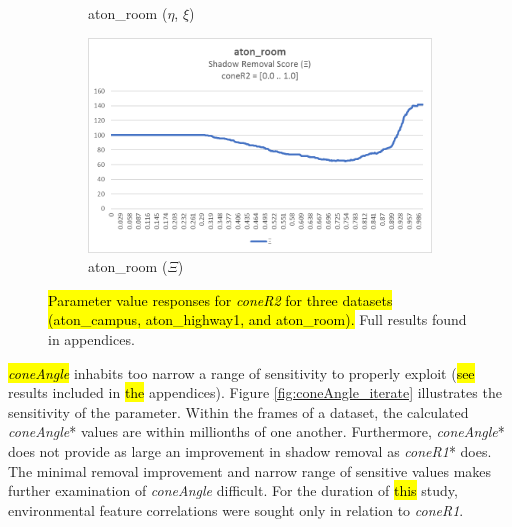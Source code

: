 \begin{figure}
\begin{subfigure}{.45\linewidth}
  \caption{aton\_room ($\eta$, $\xi$)}
\end{subfigure}
\hfill
\begin{subfigure}{.45\linewidth}
  \includegraphics[width=1\linewidth]{figures/room_coneR2_score.jpg}
  \caption{aton\_room ($\Xi$)}
\end{subfigure}

\caption{\hl{Parameter value responses for \textit{coneR2} for three datasets (aton\_campus, aton\_highway1, and aton\_room). }Full results found in appendices.}
\label{fig:coneR2_iterate}
\end{figure}

\hl{\textit{coneAngle}} inhabits too narrow a range of sensitivity to properly exploit (\hl{see} results included in \hl{the} appendices). Figure \ref{fig:coneAngle_iterate} illustrates the sensitivity of the parameter. Within the frames of a dataset, the calculated \textit{coneAngle}* values are within millionths of one another. Furthermore, \textit{coneAngle}* does not provide as large an improvement in shadow removal as \textit{coneR1}* does. The minimal removal improvement and narrow range of sensitive values makes further examination of \textit{coneAngle} difficult. For the duration of \hl{this} study, environmental feature correlations were sought only in relation to \textit{coneR1}.

